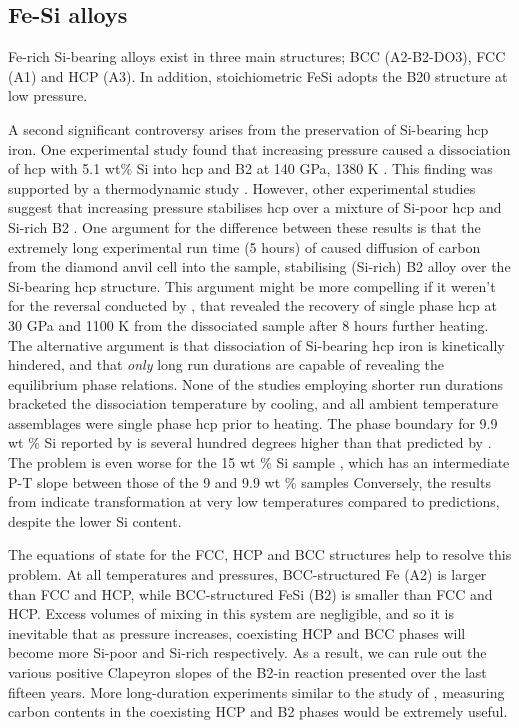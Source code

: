 \documentclass[11pt,a4paper,english]{article}
\begin{document}
\subsection{Fe-Si alloys}

Fe-rich Si-bearing alloys exist in three main structures; BCC (A2-B2-DO3), FCC (A1) and HCP (A3). In addition, stoichiometric FeSi adopts the B20 structure at low pressure. 

A second significant controversy arises from the preservation of Si-bearing hcp iron. One experimental study found that increasing pressure caused a dissociation of hcp with 5.1 wt\% Si into hcp and B2 at 140 GPa, 1380 K \citep{Dubetal2003}. This finding was supported by a thermodynamic study \citep{BMS2009}. However, other experimental studies suggest that increasing pressure stabilises hcp over a mixture of Si-poor hcp and Si-rich B2 \citep{LHCDS2002, LSFCKP2009, KSHSO2009, TKHO2015, FCRMHDP2013}. One argument for the difference between these results is that the extremely long experimental run time (5 hours) of \cite{Dubetal2003} caused diffusion of carbon from the diamond anvil cell into the sample, stabilising (Si-rich) B2 alloy over the Si-bearing hcp structure. This argument might be more compelling if it weren't for the reversal conducted by \cite{Dubetal2003}, that revealed the recovery of single phase hcp at 30 GPa and 1100 K from the dissociated sample after 8 hours further heating. The alternative argument is that dissociation of Si-bearing hcp iron is kinetically hindered, and that \emph{only} long run durations are capable of revealing the equilibrium phase relations. None of the studies employing shorter run durations bracketed the dissociation temperature by cooling, and all ambient temperature assemblages were single phase hcp prior to heating. The phase boundary for 9.9 wt \% Si reported by \cite{KSHSO2009} is several hundred degrees higher than that predicted by \cite{FCRMHDP2013}. The problem is even worse for the 15 wt \% Si sample \citep{LSFCKP2009}, which has an intermediate P-T slope between those of the 9 and 9.9 wt \% samples \citep{TKHO2015, KSHSO2009} Conversely, the results from \cite{LHCDS2002} indicate transformation at very low temperatures compared to predictions, despite the lower Si content. 

The equations of state for the FCC, HCP and BCC structures help to resolve this problem. At all temperatures and pressures, BCC-structured Fe (A2) is larger than FCC and HCP, while BCC-structured FeSi (B2) is smaller than FCC and HCP. Excess volumes of mixing in this system are negligible, and so it is inevitable that as pressure increases, coexisting HCP and BCC phases will become more Si-poor and Si-rich respectively. As a result, we can rule out the various positive Clapeyron slopes of the B2-in reaction presented over the last fifteen years. More long-duration experiments similar to the study of \cite{Dubetal2003}, measuring carbon contents in the coexisting HCP and B2 phases would be extremely useful.
\end{document}
